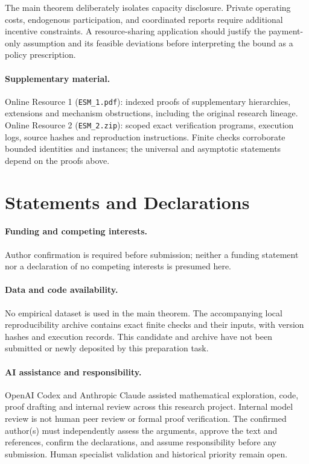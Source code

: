 \documentclass[11pt]{article}
\theoremstyle{definition}\newtheorem{definition}[theorem]{Definition}
\theoremstyle{remark}\newtheorem{remark}[theorem]{Remark}
\begin{document}
The main theorem deliberately isolates capacity disclosure. Private operating
costs, endogenous participation, and coordinated reports require additional
incentive constraints. A resource-sharing application should justify the
payment-only assumption and its feasible deviations before interpreting the
bound as a policy prescription.

\paragraph{Supplementary material.}
Online Resource 1 (\texttt{ESM\_1.pdf}): indexed proofs of supplementary
hierarchies, extensions and mechanism obstructions, including the original
research lineage. Online Resource 2 (\texttt{ESM\_2.zip}): scoped exact
verification programs, execution logs, source hashes and reproduction
instructions. Finite checks corroborate bounded identities and instances;
the universal and asymptotic statements depend on the proofs above.

\section*{Statements and Declarations}
\paragraph{Funding and competing interests.}
Author confirmation is required before submission; neither a funding statement
nor a declaration of no competing interests is presumed here.
\paragraph{Data and code availability.}
No empirical dataset is used in the main theorem. The accompanying local
reproducibility archive contains exact finite checks and their inputs, with
version hashes and execution records. This candidate and archive have not
been submitted or newly deposited by this preparation task.
\paragraph{AI assistance and responsibility.}
OpenAI Codex and Anthropic Claude assisted mathematical exploration, code,
proof drafting and internal review across this research project. Internal
model review is not human peer review or formal proof verification. The confirmed
author(s) must independently assess the arguments, approve the text and
references, confirm the declarations, and assume responsibility before any
submission. Human specialist validation and historical priority remain open.
\end{document}
